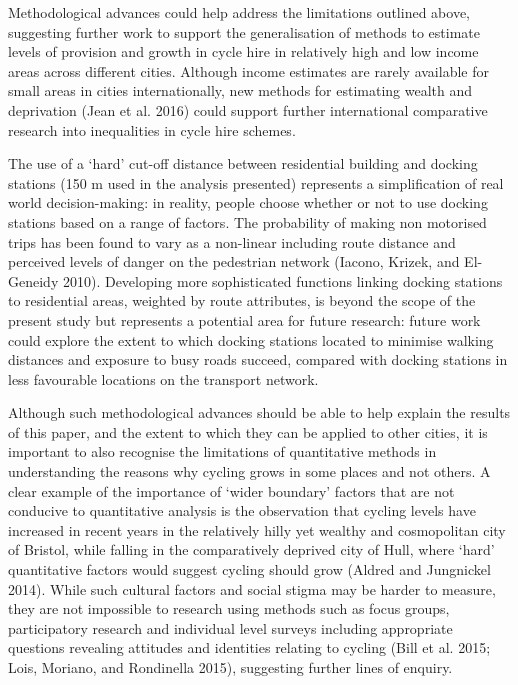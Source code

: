 \documentclass[]{article}
\begin{document}
Methodological advances could help address the limitations outlined above, suggesting further work to support the generalisation of methods to estimate levels of provision and growth in cycle hire in relatively high and low income areas across different cities.
Although income estimates are rarely available for small areas in cities internationally, new methods for estimating wealth and deprivation (Jean et al. 2016) could support further international comparative research into inequalities in cycle hire schemes.

The use of a `hard' cut-off distance between residential building and docking stations (150 m used in the analysis presented) represents a simplification of real world decision-making: in reality, people choose whether or not to use docking stations based on a range of factors.
The probability of making non motorised trips has been found to vary as a non-linear including route distance and perceived levels of danger on the pedestrian network (Iacono, Krizek, and El-Geneidy 2010).
Developing more sophisticated functions linking docking stations to residential areas, weighted by route attributes, is beyond the scope of the present study but represents a potential area for future research: future work could explore the extent to which docking stations located to minimise walking distances and exposure to busy roads succeed, compared with docking stations in less favourable locations on the transport network.

Although such methodological advances should be able to help explain the results of this paper, and the extent to which they can be applied to other cities, it is important to also recognise the limitations of quantitative methods in understanding the reasons why cycling grows in some places and not others.
A clear example of the importance of `wider boundary' factors that are not conducive to quantitative analysis is the observation that cycling levels have increased in recent years in the relatively hilly yet wealthy and cosmopolitan city of Bristol, while falling in the comparatively deprived city of Hull, where `hard' quantitative factors would suggest cycling should grow (Aldred and Jungnickel 2014).
While such cultural factors and social stigma may be harder to measure, they are not impossible to research using methods such as focus groups, participatory research and individual level surveys including appropriate questions revealing attitudes and identities relating to cycling (Bill et al. 2015; Lois, Moriano, and Rondinella 2015), suggesting further lines of enquiry.
\end{document}
